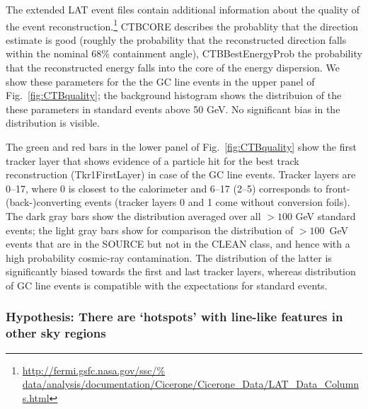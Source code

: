 \documentclass[aps,twocolumn,prd,superscriptaddress,showpacs,nofootinbib,fixfloat]{revtex4}
\begin{document}
The extended LAT event files contain additional information
about the quality of the event
reconstruction.\footnote{\url{http://fermi.gsfc.nasa.gov/ssc/%
data/analysis/documentation/Cicerone/Cicerone\_Data/LAT\_Data\_Columns.html}}
CTBCORE describes the probablity that the direction estimate
is good (roughly the probability that the reconstructed
direction falls within the nominal 68\% containment angle),
CTBBestEnergyProb the probability that the reconstructed
energy falls into the core of the energy dispersion. We show
these parameters for the the GC line events in the upper
panel of Fig.~\ref{fig:CTBquality}; the background histogram
shows the distribuion of the these parameters in standard
events above 50 GeV. No significant bias in the distribution
is visible.

The green and red bars in the lower panel of
Fig.~\ref{fig:CTBquality} show the first tracker layer that
shows evidence of a particle hit for the best track
reconstruction (Tkr1FirstLayer) in case of the GC line
events.  Tracker layers are 0--17, where 0 is closest to the
calorimeter and 6--17 (2--5) corresponds to front-
(back-)converting events (tracker layers 0 and 1 come
without conversion foils). The dark gray bars show the
distribution averaged over all $>100$ GeV standard events;
the light gray bars
show for comparison the distribution of $>100$~GeV events that are in the SOURCE
but not in the CLEAN class, and hence with a high
probability cosmic-ray contamination. The distribution of the latter is significantly biased
towards the first and last tracker layers, whereas
distribution of GC line events is compatible with the
expectations for standard events.

\subsubsection{Hypothesis: There are `hotspots' with
line-like features in other sky regions}
\end{document}
